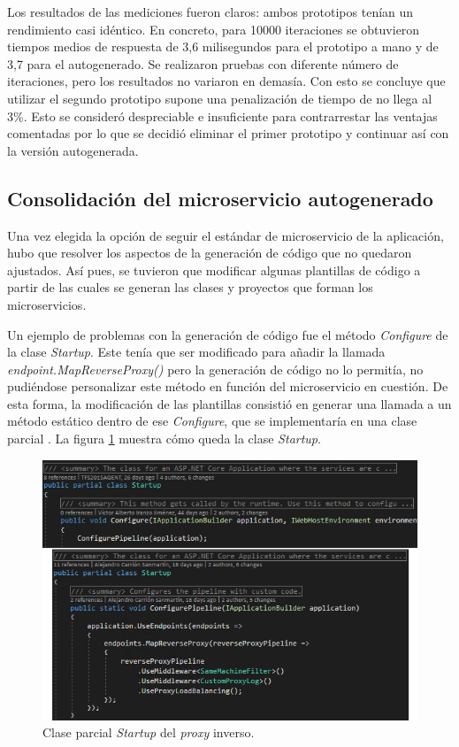 \documentclass[11pt,spanish,listoffigures]{tfgetsinf}
\begin{document}
Los resultados de las mediciones fueron claros: ambos prototipos tenían un rendimiento casi idéntico.
En concreto, para 10000 iteraciones se obtuvieron tiempos medios de respuesta de 3,6 milisegundos para el prototipo a mano y de 3,7 para el autogenerado. Se realizaron pruebas con diferente número de iteraciones, pero los resultados no variaron en demasía. Con esto se concluye que utilizar el segundo prototipo supone una penalización de tiempo de no llega al 3\%. Esto se consideró despreciable e insuficiente para contrarrestar las ventajas comentadas por lo que se decidió eliminar el primer prototipo y continuar así con la versión autogenerada.


		\subsection{Consolidación del microservicio autogenerado}

Una vez elegida la opción de seguir el estándar de microservicio de la aplicación, hubo que resolver los aspectos de la generación de código que no quedaron ajustados. Así pues, se tuvieron que modificar algunas plantillas de código a partir de las cuales se generan las clases y proyectos que forman los microservicios.

Un ejemplo de problemas con la generación de código fue el método \emph{Configure} de la clase \emph{Startup}. Este tenía que ser modificado para añadir la llamada \emph{endpoint.MapReverseProxy()} pero la generación de código no lo permitía, no pudiéndose personalizar este método en función del microservicio en cuestión. De esta forma, la modificación de las plantillas consistió en generar una llamada a un método estático dentro de ese \emph{Configure}, que se implementaría en una clase parcial \cite{ClasesParciales}. La figura \ref{startup} muestra cómo queda la clase \emph{Startup}.

\begin{figure}[ht]
\centering
\includegraphics[width=1\textwidth]{imagenes/startup}
\caption{Clase parcial \emph{Startup} del \emph{proxy} inverso.}
	\label{startup}
\end{figure}
\end{document}
